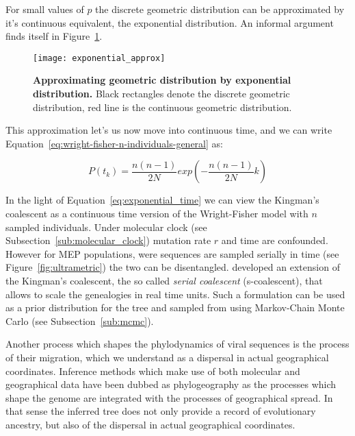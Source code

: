 For small values of $p$ the discrete geometric distribution can be approximated by it's continuous equivalent, the exponential distribution. 
An informal argument finds itself in Figure~\ref{fig:exp_approx}.

\begin{figure}[H]
\centering
\texttt{[image: exponential\_approx]} 
\caption{
{ \footnotesize 
{\bf Approximating geometric distribution by exponential distribution.} 
Black rectangles denote the discrete geometric distribution, red line is the continuous geometric distribution.
}%
}
\label{fig:exp_approx}
\end{figure}

This approximation let's us now move into continuous time, and we can write Equation~\ref{eq:wright-fisher-n-individuals-general} as:

\begin{equation}
P\left(t_{k}\right)=\frac{n\left(n-1\right)}{2N}exp\left(-\frac{n\left(n-1\right)}{2N}k\right)
\label{eq:exponential_time}
\end{equation}

In the light of Equation~\ref{eq:exponential_time} we can view the Kingman's coalescent as a continuous time version of the Wright-Fisher model with $n$ sampled individuals.
Under molecular clock (see Subsection~\ref{sub:molecular_clock}) mutation rate $r$ and time are confounded.
However for MEP populations, were sequences are sampled serially in time (see Figure~\ref{fig:ultrametric}) the two can be disentangled.
\cite{Rodrigo1999} developed an extension of the Kingman's coalescent, the so called \textit{serial coalescent} (s-coalescent), that allows to scale the genealogies in real time units.
Such a formulation can be used as a prior distribution for the tree and sampled from using Markov-Chain Monte Carlo (see Subsection~\ref{sub:mcmc}).

Another process which shapes the phylodynamics of viral sequences is the process of their migration, which we understand as a dispersal in actual geographical coordinates.  
Inference methods which make use of both molecular and geographical data have been dubbed as phylogeography as the processes which shape the genome are integrated with the processes of geographical spread.
In that sense the inferred tree does not only provide a record of evolutionary ancestry, but also of the dispersal in actual geographical coordinates.

